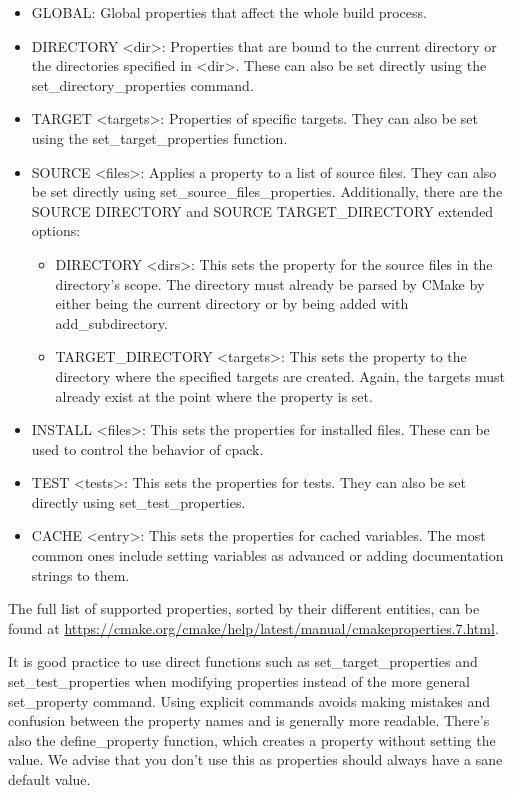 \begin{itemize}
\item 
GLOBAL: Global properties that affect the whole build process.

\item 
DIRECTORY <dir>: Properties that are bound to the current directory or the directories specified in <dir>. These can also be set directly using the set\_directory\_properties command.

\item 
TARGET <targets>: Properties of specific targets. They can also be set using the set\_target\_properties function.

\item 
SOURCE <files>: Applies a property to a list of source files. They can also be set directly using set\_source\_files\_properties. Additionally, there are the SOURCE DIRECTORY and SOURCE TARGET\_DIRECTORY extended options:

\begin{itemize}
\item 
DIRECTORY <dirs>: This sets the property for the source files in the directory's scope. The directory must already be parsed by CMake by either being the current directory or by being added with add\_subdirectory.

\item 
TARGET\_DIRECTORY <targets>: This sets the property to the directory where the specified targets are created. Again, the targets must already exist at the point where the property is set.
\end{itemize}

\item 
INSTALL <files>: This sets the properties for installed files. These can be used to control the behavior of cpack.

\item 
TEST <tests>: This sets the properties for tests. They can also be set directly using set\_test\_properties.

\item 
CACHE <entry>: This sets the properties for cached variables. The most common ones include setting variables as advanced or adding documentation strings to them.
\end{itemize}

The full list of supported properties, sorted by their different entities, can be found at \url{https://cmake.org/cmake/help/latest/manual/cmakeproperties.7.html}.

It is good practice to use direct functions such as set\_target\_properties and set\_test\_properties when modifying properties instead of the more general set\_property command. Using explicit commands avoids making mistakes and confusion between the property names and is generally more readable. There's also the define\_property function, which creates a property without setting the value. We advise that you don't use this as properties should always have a sane default value.

